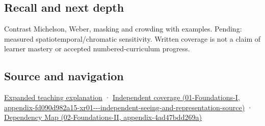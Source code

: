 \subsection{Recall and next depth}\label{appendix-b3aa9e8e01ad-recall-and-next-depth}

Contrast Michelson, Weber, masking and crowding with examples. Pending: measured spatiotemporal/chromatic sensitivity. Written coverage is not a claim of learner mastery or accepted numbered-curriculum progress.

\subsection{Source and navigation}\label{appendix-b3aa9e8e01ad-source-and-navigation}

\hyperref[04-visual-computing-ii-ch042-visibility-is-about-contrast-conditions-and-tasks]{Expanded teaching explanation} · \href{../01-Foundations-I/main.pdf\#nameddest=appendix-fd090d982a15-xr01---independent-seeing-and-representation-source}{Independent coverage (01-Foundations-I, appendix-fd090d982a15-xr01-\/-\/-independent-seeing-and-representation-source)} · \href{../02-Foundations-II/main.pdf\#nameddest=appendix-4ad47bdd269a}{Dependency Map (02-Foundations-II, appendix-4ad47bdd269a)}
